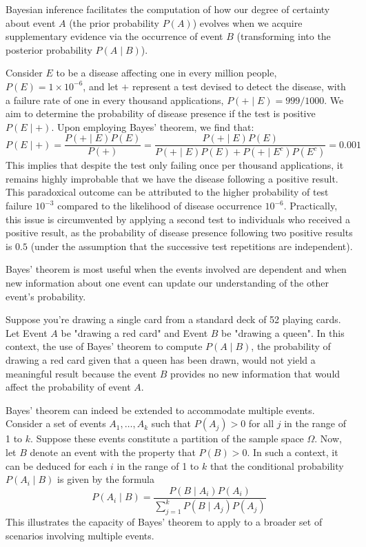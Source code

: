 Bayesian inference facilitates the computation of how our degree of certainty about event $A$ (the prior probability $P\left( A \right)$) evolves when we acquire supplementary evidence via the occurrence of event $B$ (transforming into the posterior probability $P\left( A \mid B \right)$).

\begin{example}
Consider $E$ to be a disease affecting one in every million people, $P(E) = 1 \times 10^{-6}$, and let $+$ represent a test devised to detect the disease, with a failure rate of one in every thousand applications, $P(+ \mid E) = 999/1000$. We aim to determine the probability of disease presence if the test is positive $P(E \mid +)$. Upon employing Bayes' theorem, we find that:
\[
P(E \mid +) = \frac{P(+ \mid E) P(E)}{P(+)} = \frac{P(+ \mid E) P(E)}{P(+ \mid E) P(E) + P(+ \mid E^c) P(E^c)} = 0.001
\]
This implies that despite the test only failing once per thousand applications, it remains highly improbable that we have the disease following a positive result. This paradoxical outcome can be attributed to the higher probability of test failure $10^{-3}$ compared to the likelihood of disease occurrence $10^{-6}$. Practically, this issue is circumvented by applying a second test to individuals who received a positive result, as the probability of disease presence following two positive results is $0.5$ (under the assumption that the successive test repetitions are independent).
\end{example}

Bayes' theorem is most useful when the events involved are dependent and when new information about one event can update our understanding of the other event's probability.

\begin{example}
Suppose you're drawing a single card from a standard deck of 52 playing cards. Let Event $A$ be "drawing a red card" and Event $B$ be "drawing a queen". In this context, the use of Bayes' theorem to compute $P(A \mid B)$, the probability of drawing a red card given that a queen has been drawn, would not yield a meaningful result because the event $B$ provides no new information that would affect the probability of event $A$.
\end{example}

Bayes' theorem can indeed be extended to accommodate multiple events. Consider a set of events $A_{1}, \ldots, A_{k}$ such that $P\left( A_{j} \right)>0$ for all $j$ in the range of 1 to $k$. Suppose these events constitute a partition of the sample space $\Omega$. Now, let $B$ denote an event with the property that $P\left(B\right)>0$. In such a context, it can be deduced for each $i$ in the range of 1 to $k$ that the conditional probability $P\left(A_{i}\mid B\right)$ is given by the formula
\[
P\left(A_{i}\mid B\right)=\frac{P\left(B\mid A_{i}\right) P\left(A_{i}\right)}{\sum_{j=1}^{k} P\left(B \mid A_{j}\right) P\left(A_{j}\right)}
\]
This illustrates the capacity of Bayes' theorem to apply to a broader set of scenarios involving multiple events.


